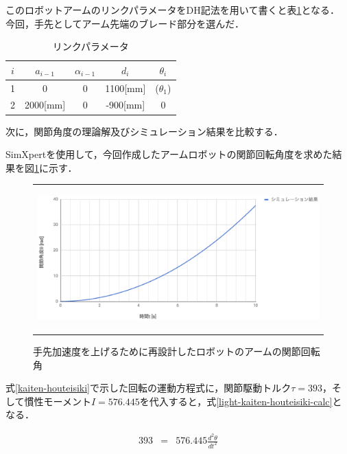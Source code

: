このロボットアームのリンクパラメータをDH記法を用いて書くと表\ref{light-dh-link}となる．
今回，手先としてアーム先端のブレード部分を選んだ．

\begin{table}[htb]
\caption[]{リンクパラメータ}
  \begin{center}
    \begin{tabular}{|c|c|c|c|c|} \hline
      $i$ & $a_{i-1}$ & $\alpha_{i-1}$ & $d_i$ & $\theta_i$\\ \hline \hline
      1 & 0 & 0 & 1100[mm] & ($\theta_1$) \\ \hline
      2 & 2000[mm] & 0 & -900[mm] & 0 \\ \hline
    \end{tabular}
    \label{light-dh-link}
  \end{center}
\end{table}

次に，関節角度の理論解及びシミュレーション結果を比較する．

SimXpertを使用して，今回作成したアームロボットの関節回転角度を求めた結果を図\ref{strong-kaiten}に示す．

\begin{figure}[htbp]
  \begin{center}
    \begin{tabular}{c}
      \includegraphics[height=5.5cm]{img/eps/light-kaiten2.eps}
    \end{tabular}
    \caption{手先加速度を上げるために再設計したロボットのアームの関節回転角}
    \label{strong-kaiten}
  \end{center}
\end{figure}

式\ref{kaiten-houteisiki}で示した回転の運動方程式に，関節駆動トルク\(\tau=393\)，そして慣性モーメント\(I=576.445\)を代入すると，式\ref{light-kaiten-houteisiki-calc}となる．

\begin{eqnarray}
  393 &=& 576.445 \frac{d^2 \theta}{d t^2}
  \label{light-kaiten-houteisiki-calc}
\end{eqnarray}

